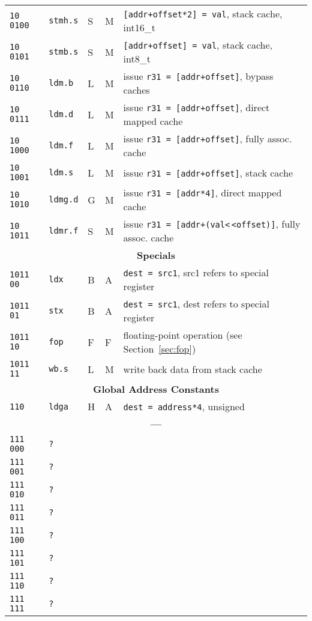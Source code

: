\documentclass[10pt,DIV12]{scrartcl}
\newcommand{\shl}{\textless$\,\!$\textless}
\begin{document}
\begin{longtable}{llllp{}}
\texttt{10 0100} & \texttt{stmh.s} & S & M & \texttt{[addr+offset*2] = val}, stack cache, int16\_t \\
\texttt{10 0101} & \texttt{stmb.s} & S & M & \texttt{[addr+offset] = val}, stack cache, int8\_t \\
\texttt{10 0110} & \texttt{ldm.b} & L & M & issue \texttt{r31 = [addr+offset]}, bypass caches \\
\texttt{10 0111} & \texttt{ldm.d} & L & M & issue \texttt{r31 = [addr+offset]}, direct mapped cache \\
\texttt{10 1000} & \texttt{ldm.f} & L & M & issue \texttt{r31 = [addr+offset]}, fully assoc. cache \\
\texttt{10 1001} & \texttt{ldm.s} & L & M & issue \texttt{r31 = [addr+offset]}, stack cache \\
\texttt{10 1010} & \texttt{ldmg.d} & G & M & issue \texttt{r31 = [addr*4]}, direct mapped cache\\
\texttt{10 1011} & \texttt{ldmr.f} & S & M & issue \texttt{r31 = [addr+(val\shl{}offset)]}, fully assoc. cache\\
\midrule
\multicolumn{5}{c}{\textsf{\textbf{Specials}}} \\
\cmidrule{1-5}
\texttt{1011 00} & \texttt{ldx} & B & A & \texttt{dest = src1}, src1 refers to special register \\
\texttt{1011 01} & \texttt{stx} & B & A & \texttt{dest = src1}, dest refers to special register \\
\texttt{1011 10} & \texttt{fop} & F & F & floating-point operation (see Section~\ref{sec:fop}) \\
\texttt{1011 11} & \texttt{wb.s} & L & M & write back data from stack cache \\
\midrule
\multicolumn{5}{c}{\textsf{\textbf{Global Address Constants}}} \\
\cmidrule{1-5}
\texttt{110} & \texttt{ldga} & H & A & \texttt{dest = address*4}, unsigned \\
\midrule
\multicolumn{5}{c}{\textbf{---}} \\
\cmidrule{1-5}
\texttt{111 000} & \texttt{?} & & & \\
\texttt{111 001} & \texttt{?} & & & \\
\texttt{111 010} & \texttt{?} & & & \\
\texttt{111 011} & \texttt{?} & & & \\
\texttt{111 100} & \texttt{?} & & & \\
\texttt{111 101} & \texttt{?} & & & \\
\texttt{111 110} & \texttt{?} & & & \\
\texttt{111 111} & \texttt{?} & & & \\
\bottomrule
\end{longtable}  
\end{document}
